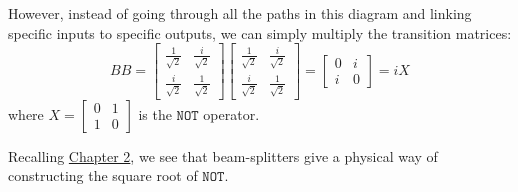 \documentclass[fleqn]{article}
\begin{document}
However, instead of going through all the paths in this diagram and linking specific inputs to specific outputs, we can simply multiply the transition matrices:
\[
  BB =
  \begin{bmatrix}
    \frac{1}{\sqrt 2} & \frac{i}{\sqrt 2}\\
    \frac{i}{\sqrt 2} & \frac{1}{\sqrt 2}
  \end{bmatrix}
  \begin{bmatrix}
    \frac{1}{\sqrt 2} & \frac{i}{\sqrt 2}\\
    \frac{i}{\sqrt 2} & \frac{1}{\sqrt 2}
  \end{bmatrix}
  =
  \begin{bmatrix}
  0 & i\\
  i & 0
  \end{bmatrix}
  = iX
\]
where \(X=\begin{bmatrix}0&1\\1&0\end{bmatrix}\) is the \(\texttt{NOT}\) operator.

Recalling \href{Chapter\%202}{Chapter 2}, we see that beam-splitters give a physical way of constructing the square root of \(\texttt{NOT}\).
\end{document}
